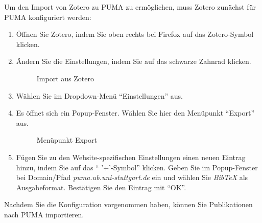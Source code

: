 Um den Import von Zotero zu PUMA zu ermöglichen, muss Zotero zunächst für PUMA konfiguriert werden:
\begin{enumerate}
    \item Öffnen Sie Zotero, indem Sie oben rechts bei Firefox auf das Zotero-Symbol klicken.
    \item Ändern Sie die Einstellungen, indem Sie auf das schwarze Zahnrad klicken. 
\begin{figure}[h!]
 \centering
 \caption{Import aus Zotero}
 \label{fig:importZotero}
\end{figure}
    \item Wählen Sie im Dropdown-Menü \enquote{Einstellungen} aus.
    \item Es öffnet sich ein Popup-Fenster. Wählen Sie hier den Menüpunkt \enquote{Export} aus.
\begin{figure}[h!]
 \centering
 \caption{Menüpunkt Export}
 \label{fig:menueExport}
\end{figure} 
    \item Fügen Sie zu den Website-spezifischen Einstellungen einen neuen Eintrag hinzu, indem Sie auf das \enquote{ '+'-Symbol} klicken. Geben Sie im Popup-Fenster bei Domain/Pfad \textit{puma.ub.uni-stuttgart.de} ein und wählen Sie \textit{BibTeX} als Ausgabeformat. Bestätigen Sie den Eintrag mit \enquote{OK}. 
\end{enumerate}
Nachdem Sie die Konfiguration vorgenommen haben, können Sie Publikationen nach PUMA importieren. 
